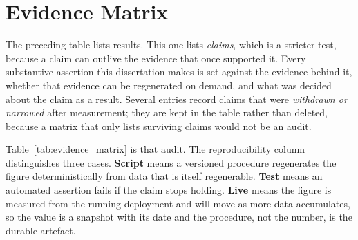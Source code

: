 \section{Evidence Matrix}
\label{app:evidence_matrix}

The preceding table lists results. This one lists \emph{claims}, which is a stricter test, because a
claim can outlive the evidence that once supported it. Every substantive assertion this dissertation
makes is set against the evidence behind it, whether that evidence can be regenerated on demand, and
what was decided about the claim as a result. Several entries record claims that were \emph{withdrawn or
narrowed} after measurement; they are kept in the table rather than deleted, because a matrix that
only lists surviving claims would not be an audit.

Table~\ref{tab:evidence_matrix} is that audit. The reproducibility column distinguishes three cases. \textbf{Script} means a versioned procedure
regenerates the figure deterministically from data that is itself regenerable. \textbf{Test} means an
automated assertion fails if the claim stops holding. \textbf{Live} means the figure is measured from
the running deployment and will move as more data accumulates, so the value is a snapshot with its
date and the procedure, not the number, is the durable artefact.

